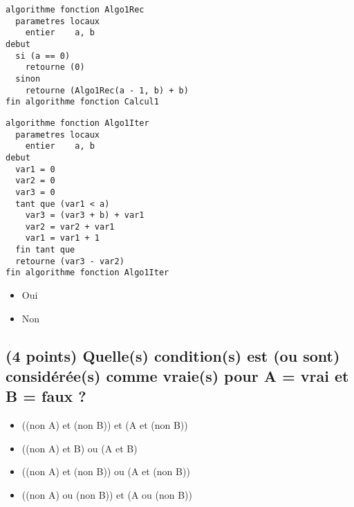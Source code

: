 \documentclass[11pt,a4paper]{article}
\begin{document}
\begin{table}[ht!]
  \centering
  \begin{minipage}{0.5\textwidth}
    \centering
  \begin{lstlisting}[style=algorithmique]
algorithme fonction Algo1Rec
  parametres locaux
    entier    a, b
debut
  si (a == 0)
    retourne (0)
  sinon
    retourne (Algo1Rec(a - 1, b) + b)
fin algorithme fonction Calcul1 \end{lstlisting}
  \end{minipage}
  \hfillx
  \begin{minipage}{0.5\textwidth}
    \centering
  \begin{lstlisting}[style=algorithmique]
algorithme fonction Algo1Iter
  parametres locaux
    entier    a, b
debut
  var1 = 0
  var2 = 0
  var3 = 0
  tant que (var1 < a)
    var3 = (var3 + b) + var1
    var2 = var2 + var1
    var1 = var1 + 1
  fin tant que
  retourne (var3 - var2)
fin algorithme fonction Algo1Iter \end{lstlisting}
  \end{minipage}
\end{table}

\smallskip

\begin{itemize}
  \item[\CaseCoche] Oui \\
  \item[\CaseCoche] Non \\
\end{itemize}


\bigskip


\subsection{(4 points) Quelle(s) condition(s) est (ou sont) considérée(s) comme vraie(s) pour A = vrai et B = faux ? }

\begin{itemize}
  \item[\CaseCoche] ((non A) et (non B)) et (A et (non B)) \\
  \item[\CaseCoche] ((non A) et    B)    ou (A et    B)    \\
  \item[\CaseCoche] ((non A) et (non B)) ou (A et (non B)) \\
  \item[\CaseCoche] ((non A) ou (non B)) et (A ou (non B)) \\
\end{itemize}
\end{document}
